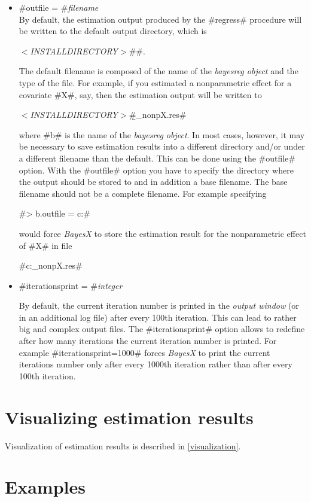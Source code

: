 \begin{itemize}
\item #outfile = #{\em filename} \\
By default, the estimation output produced by the #regress#
procedure will be written to the default output directory, which
is

{\em $<$INSTALLDIRECTORY$>$}#\output#.

The default filename is composed of the name of the {\em bayesreg
object} and the type of the file. For example, if you estimated a
nonparametric effect for a covariate #X#, say, then the estimation
output will be written to

{\em$<$INSTALLDIRECTORY$>$}#\output\b_nonpX.res#

where #b# is the name of the {\em bayesreg object}. In most cases,
however, it may be necessary to save estimation results into a
different directory and/or under a different filename than the
default. This can be done using the #outfile# option. With the
#outfile# option you have to specify the directory where the
output should be stored to and in addition a base filename. The
base filename should not be a complete filename. For example
specifying

#> b.outfile = c:\data\res#

would force {\em BayesX} to store the estimation result for the
nonparametric effect of #X# in file

#c:\data\res_nonpX.res#

\item #iterationsprint = #{\em integer}

By default, the current iteration number is printed in the {\em
output window} (or in an additional log file) after every 100th
iteration. This can lead to rather big and complex output files.
The #iterationsprint# option allows to redefine after how many
iterations the current iteration number is printed. For example
#iterationsprint=1000# forces {\em BayesX} to print the current
iterations number only after every 1000th iteration rather than
after every 100th iteration.
\end{itemize}

\section{Visualizing estimation results}

Visualization of estimation results is described in
\autoref{visualization}.

\section{Examples}
\label{bayesregexamples}

